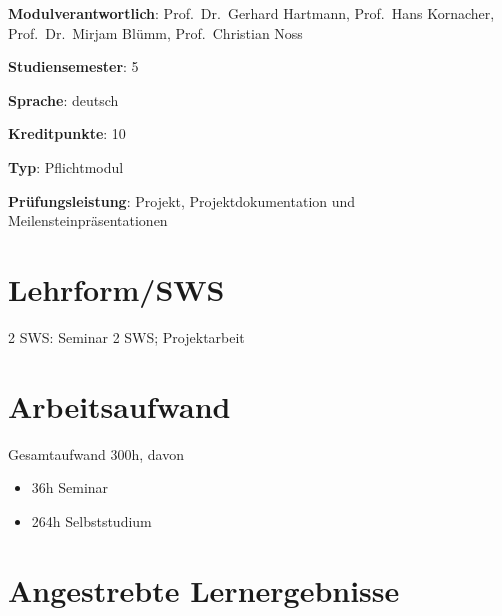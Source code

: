 \begin{modulHead}
\textbf{Modulverantwortlich}: Prof.~Dr.~Gerhard
Hartmann, Prof.~Hans Kornacher, Prof.~Dr.~Mirjam Blümm, Prof.~Christian
Noss
\end{modulHead}
\begin{modulHead}
\textbf{Studiensemester}:
5
\end{modulHead}
\begin{modulHead}
\textbf{Sprache}:
deutsch
\end{modulHead}
\begin{modulHead}
\textbf{Kreditpunkte}:
10
\end{modulHead}
\begin{modulHead}
\textbf{Typ}:
Pflichtmodul
\end{modulHead}
\begin{modulHead}
\textbf{Prüfungsleistung}:
Projekt, Projektdokumentation und
Meilensteinpräsentationen
\end{modulHead}


\hypertarget{lehrformswspathlabelmi-2017modulbeschreibungen-bachelorba_entwicklungsprojekt}{%
\section*{Lehrform/SWS\label{/mi-2017/modulbeschreibungen-bachelor/BA_Entwicklungsprojekt}}\label{lehrformswspathlabelmi-2017modulbeschreibungen-bachelorba_entwicklungsprojekt}}

2 SWS: Seminar 2 SWS; Projektarbeit

\hypertarget{arbeitsaufwandpathlabelmi-2017modulbeschreibungen-bachelorba_entwicklungsprojekt}{%
\section*{Arbeitsaufwand\label{/mi-2017/modulbeschreibungen-bachelor/BA_Entwicklungsprojekt}}\label{arbeitsaufwandpathlabelmi-2017modulbeschreibungen-bachelorba_entwicklungsprojekt}}

Gesamtaufwand 300h, davon

\begin{itemize}
\tightlist
\item
  36h Seminar
\item
  264h Selbststudium
\end{itemize}

\hypertarget{angestrebte-lernergebnissepathlabelmi-2017modulbeschreibungen-bachelorba_entwicklungsprojekt}{%
\section*{Angestrebte
Lernergebnisse\label{/mi-2017/modulbeschreibungen-bachelor/BA_Entwicklungsprojekt}}\label{angestrebte-lernergebnissepathlabelmi-2017modulbeschreibungen-bachelorba_entwicklungsprojekt}}

